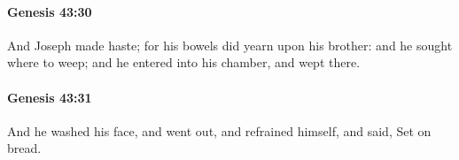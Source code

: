 		\paragraph{Genesis 43:30} %
			\label{GENESIS-43-30}

			And Joseph made haste; for his bowels did yearn upon his brother: and he sought where to weep; and he entered into his chamber, and wept there.


		\paragraph{Genesis 43:31} %
			\label{GENESIS-43-31}

			And he washed his face, and went out, and refrained himself, and said, Set on bread.


